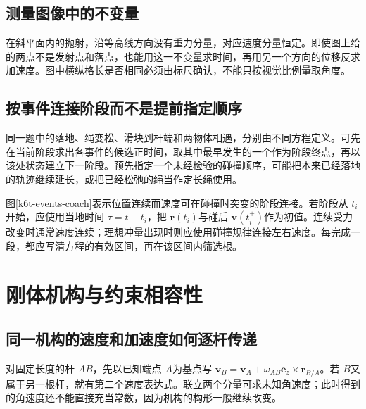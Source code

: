 \subsection{测量图像中的不变量}
在斜平面内的抛射，沿等高线方向没有重力分量，对应速度分量恒定。即使图上给的两点不是发射点和落点，也能用这一不变量求时间，再用另一个方向的位移反求加速度。图中横纵格长是否相同必须由标尺确认，不能只按视觉比例量取角度。

\subsection{按事件连接阶段而不是提前指定顺序}
同一题中的落地、绳变松、滑块到杆端和两物体相遇，分别由不同方程定义。可先在当前阶段求出各事件的候选正时间，取其中最早发生的一个作为阶段终点，再以该处状态建立下一阶段。预先指定一个未经检验的碰撞顺序，可能把本来已经落地的轨迹继续延长，或把已经松弛的绳当作定长绳使用。

图\ref{k6t-events-coach}表示位置连续而速度可在碰撞时突变的阶段连接。若阶段从 $t_i$开始，应使用当地时间 $\tau=t-t_i$，把 $\bm r(t_i)$与碰后 $\bm v(t_i^+)$作为初值。连续受力改变时通常速度连续；理想冲量出现时则应使用碰撞规律连接左右速度。每完成一段，都应写清方程的有效区间，再在该区间内筛选根。

\section{刚体机构与约束相容性}
\subsection{同一机构的速度和加速度如何逐杆传递}
对固定长度的杆 $AB$，先以已知端点 $A$为基点写 $\bm v_B=\bm v_A+\omega_{AB}\bm e_z\times\bm r_{B/A}$。若 $B$又属于另一根杆，就有第二个速度表达式。联立两个分量可求未知角速度；此时得到的角速度还不能直接充当常数，因为机构的构形一般继续改变。

